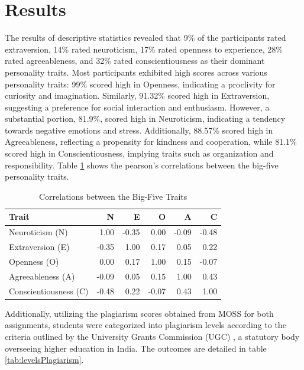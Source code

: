 \section{Results}
\label{sec:findings}
The results of descriptive statistics revealed that 9\% of the participants rated extraversion, 14\% rated neuroticism, 17\% rated openness to experience, 28\% rated agreeableness, and 32\% rated conscientiousness as their dominant personality traits. Most participants exhibited high scores across various personality traits: 99\% scored high in Openness, indicating a proclivity for curiosity and imagination. Similarly, 91.32\% scored high in Extraversion, suggesting a preference for social interaction and enthusiasm. However, a substantial portion, 81.9\%, scored high in Neuroticism, indicating a tendency towards negative emotions and stress. Additionally, 88.57\% scored high in Agreeableness, reflecting a propensity for kindness and cooperation, while 81.1\% scored high in Conscientiousness, implying traits such as organization and responsibility. Table \ref{tab:correl} shows the pearson's correlations between the big-five personality traits. 

\begin{table}[h]
  \centering
  \caption{Correlations between the Big-Five Traits\label{tab:correl}}
  \begin{tabular}{p{3cm}rrrrr}
    \toprule
    Trait & N & E & O & A & C \\\midrule
    Neuroticism (N) & 1.00 & -0.35 & 0.00 & -0.09 & -0.48 \\
    Extraversion (E) & -0.35 & 1.00 & 0.17 & 0.05 &	0.22 \\
    Openness (O) & 0.00 & 0.17 & 1.00 &	0.15 & -0.07 \\
    Agreeableness (A) & -0.09 &	0.05 & 0.15 & 1.00 & 0.43 \\ 
    Conscientiousness (C) & -0.48 & 0.22 & -0.07 &	0.43 &	1.00  \\\bottomrule
  \end{tabular}
\end{table}

Additionally, utilizing the plagiarism scores obtained from MOSS for both assignments, students were categorized into plagiarism levels according to the criteria outlined by the University Grants Commission (UGC) \cite{UGCPlagiarism}, a statutory body overseeing higher education in India. The outcomes are detailed in table \ref{tab:levelsPlagiarism}.

